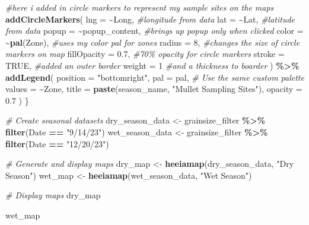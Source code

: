\documentclass[
]{article}
\newenvironment{Shaded}{\begin{snugshade}}{\end{snugshade}}
\newcommand{\AttributeTok}[1]{\textcolor[rgb]{0.13,0.29,0.53}{#1}}
\newcommand{\CommentTok}[1]{\textcolor[rgb]{0.56,0.35,0.01}{\textit{#1}}}
\newcommand{\ConstantTok}[1]{\textcolor[rgb]{0.56,0.35,0.01}{#1}}
\newcommand{\DecValTok}[1]{\textcolor[rgb]{0.00,0.00,0.81}{#1}}
\newcommand{\FloatTok}[1]{\textcolor[rgb]{0.00,0.00,0.81}{#1}}
\newcommand{\FunctionTok}[1]{\textcolor[rgb]{0.13,0.29,0.53}{\textbf{#1}}}
\newcommand{\NormalTok}[1]{#1}
\newcommand{\OtherTok}[1]{\textcolor[rgb]{0.56,0.35,0.01}{#1}}
\newcommand{\SpecialCharTok}[1]{\textcolor[rgb]{0.81,0.36,0.00}{\textbf{#1}}}
\newcommand{\StringTok}[1]{\textcolor[rgb]{0.31,0.60,0.02}{#1}}
\begin{document}
\begin{Shaded}
\begin{Highlighting}[]
    \CommentTok{\#here i added in circle markers to represent my sample sites on the maps}
    \FunctionTok{addCircleMarkers}\NormalTok{(}
    \AttributeTok{lng =} \SpecialCharTok{\textasciitilde{}}\NormalTok{Long,      }\CommentTok{\#longitude from data}
    \AttributeTok{lat =} \SpecialCharTok{\textasciitilde{}}\NormalTok{Lat,       }\CommentTok{\#latitude from data}
    \AttributeTok{popup =} \SpecialCharTok{\textasciitilde{}}\NormalTok{popup\_content,  }\CommentTok{\#brings up popup only when clicked}
    \AttributeTok{color =} \SpecialCharTok{\textasciitilde{}}\FunctionTok{pal}\NormalTok{(Zone),     }\CommentTok{\#uses my color pal for zones}
    \AttributeTok{radius =} \DecValTok{8}\NormalTok{,            }\CommentTok{\#changes the size of circle markers  on map}
    \AttributeTok{fillOpacity =} \FloatTok{0.7}\NormalTok{,     }\CommentTok{\#70\% opacity for circle markers}
    \AttributeTok{stroke =} \ConstantTok{TRUE}\NormalTok{,         }\CommentTok{\#added an outer border}
    \AttributeTok{weight =} \DecValTok{1}            \CommentTok{\#and a thickness to boarder}
\NormalTok{) }\SpecialCharTok{\%\textgreater{}\%}
    \FunctionTok{addLegend}\NormalTok{(}
      \AttributeTok{position =} \StringTok{"bottomright"}\NormalTok{,}
      \AttributeTok{pal =}\NormalTok{ pal,  }\CommentTok{\# Use the same custom palette}
      \AttributeTok{values =} \SpecialCharTok{\textasciitilde{}}\NormalTok{Zone,}
      \AttributeTok{title =} \FunctionTok{paste}\NormalTok{(season\_name, }\StringTok{"Mullet Sampling Sites"}\NormalTok{),}
      \AttributeTok{opacity =} \FloatTok{0.7}
\NormalTok{    )}
\NormalTok{\}}

\CommentTok{\# Create seasonal datasets}
\NormalTok{dry\_season\_data }\OtherTok{\textless{}{-}}\NormalTok{ grainsize\_filter }\SpecialCharTok{\%\textgreater{}\%} 
  \FunctionTok{filter}\NormalTok{(Date }\SpecialCharTok{==} \StringTok{"9/14/23"}\NormalTok{)}
\NormalTok{wet\_season\_data }\OtherTok{\textless{}{-}}\NormalTok{ grainsize\_filter }\SpecialCharTok{\%\textgreater{}\%} 
  \FunctionTok{filter}\NormalTok{(Date }\SpecialCharTok{==} \StringTok{"12/20/23"}\NormalTok{)}

\CommentTok{\# Generate and display maps}
\NormalTok{dry\_map }\OtherTok{\textless{}{-}} \FunctionTok{heeiamap}\NormalTok{(dry\_season\_data, }\StringTok{"Dry Season"}\NormalTok{)}
\NormalTok{wet\_map }\OtherTok{\textless{}{-}} \FunctionTok{heeiamap}\NormalTok{(wet\_season\_data, }\StringTok{"Wet Season"}\NormalTok{)}

\CommentTok{\# Display maps}
\NormalTok{dry\_map}
\end{Highlighting}
\end{Shaded}

\begin{Shaded}
\begin{Highlighting}[]
\NormalTok{wet\_map}
\end{Highlighting}
\end{Shaded}
\end{document}
